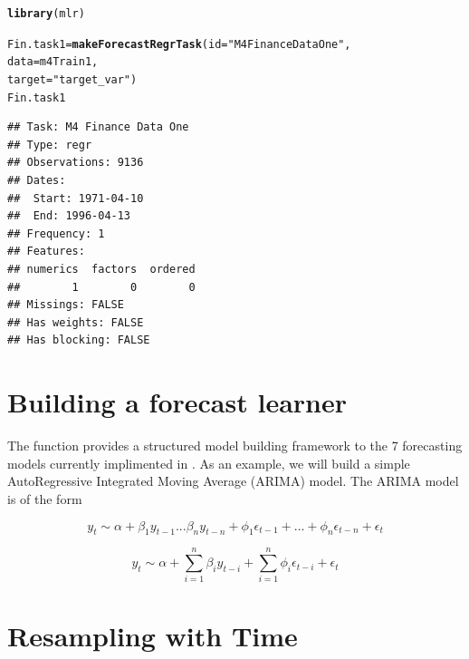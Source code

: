 \documentclass[article]{jss}\usepackage[]{graphicx}\usepackage[]{color}
\makeatletter
\newcommand{\hlstr}[1]{\textcolor[rgb]{0.192,0.494,0.8}{#1}}%
\newcommand{\hlstd}[1]{\textcolor[rgb]{0.345,0.345,0.345}{#1}}%
\newcommand{\hlkwb}[1]{\textcolor[rgb]{0.69,0.353,0.396}{#1}}%
\newcommand{\hlkwc}[1]{\textcolor[rgb]{0.333,0.667,0.333}{#1}}%
\newcommand{\hlkwd}[1]{\textcolor[rgb]{0.737,0.353,0.396}{\textbf{#1}}}%
\newenvironment{kframe}{%
 \def\at@end@of@kframe{}%
 \ifinner\ifhmode%
  \def\at@end@of@kframe{\end{minipage}}%
  \begin{minipage}{\columnwidth}%
 \fi\fi%
 \def\FrameCommand##1{\hskip\@totalleftmargin \hskip-\fboxsep
 \colorbox{shadecolor}{##1}\hskip-\fboxsep
     \hskip-\linewidth \hskip-\@totalleftmargin \hskip\columnwidth}%
 \MakeFramed {\advance\hsize-\width
   \@totalleftmargin\z@ \linewidth\hsize
   \@setminipage}}%
 {\par\unskip\endMakeFramed%
 \at@end@of@kframe}
\newenvironment{knitrout}{}{} %
\makeatother
\begin{document}
\begin{knitrout}
\color{fgcolor}\begin{kframe}
\begin{alltt}
\hlkwd{library}\hlstd{(mlr)}
\end{alltt}


{\ttfamily\noindent\itshape\color{messagecolor}{\#\# Loading required package: ParamHelpers}}\begin{alltt}
\hlstd{Fin.task1} \hlkwb{=} \hlkwd{makeForecastRegrTask}\hlstd{(}\hlkwc{id} \hlstd{=} \hlstr{"M4 Finance Data One"}\hlstd{,}
                                 \hlkwc{data} \hlstd{= m4Train1,}
                                 \hlkwc{target} \hlstd{=} \hlstr{"target_var"}\hlstd{)}
\hlstd{Fin.task1}
\end{alltt}
\begin{verbatim}
## Task: M4 Finance Data One
## Type: regr
## Observations: 9136
## Dates:
##  Start: 1971-04-10 
##  End: 1996-04-13
## Frequency: 1
## Features:
## numerics  factors  ordered 
##        1        0        0 
## Missings: FALSE
## Has weights: FALSE
## Has blocking: FALSE
\end{verbatim}
\end{kframe}
\end{knitrout}

\section{Building a forecast learner}

The  function provides a structured model building framework to the 7 forecasting models currently implimented in . As an example, we will build a simple AutoRegressive Integrated Moving Average (ARIMA) model. The ARIMA model is of the form

\begin{equation}
y_t \sim \alpha + \beta_1 y_{t-1} ... \beta_n y_{t-n} + \phi_1 \epsilon_{t-1} + ... + \phi_n \epsilon_{t-n} + \epsilon_t
\end{equation}

\begin{equation}
y_t \sim \alpha + \sum_{i=1}^n \beta_i y_{t-i} + \sum_{i=1}^n \phi_i \epsilon_{t-i} +\epsilon_t
\end{equation}


\section{Resampling with Time}
\end{document}
